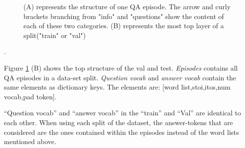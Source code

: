 \begin{figure}[H]
    \centering
    \caption{ (A) represents the structure of one QA episode. The arrow and curly brackets branching from "info" and "questions" show the content of each of these two categories. (B) represents the most top layer of a split("train" or "val")}
    \label{fig:episode}
\end{figure}.



Figure \ref{fig:episode} (B) shows the top structure of the val and test. \textit{Episodes} contains all QA episodes in a data-set split. \textit{Question vocab} and \textit{answer vocab} contain the same elements as dictionary keys. The elements are: [word list,stoi,itos,num vocab,pad token].

“Question vocab” and “answer vocab” in the “train” and “Val” are identical to each other. When using each split of the dataset, the answer-tokens that are considered are the ones contained within the episodes instead of the word lists mentioned above. 

